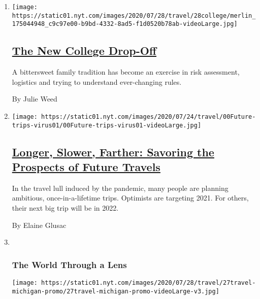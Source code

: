 \begin{enumerate}
\def\labelenumi{\arabic{enumi}.}
\item
  \texttt{[image: https://static01.nyt.com/images/2020/07/28/travel/28college/merlin\_175044948\_c9c97e00-b9bd-4332-8ad5-f1d0520b78ab-videoLarge.jpg]}

  \hypertarget{the-new-college-drop-off}{%
  \subsection{\texorpdfstring{\href{/2020/07/29/travel/virus-college-travel-restrictions.html}{The
  New College
  Drop-Off}}{The New College Drop-Off}}\label{the-new-college-drop-off}}

  A bittersweet family tradition has become an exercise in risk
  assessment, logistics and trying to understand ever-changing rules.

  By Julie Weed
\item
  \texttt{[image: https://static01.nyt.com/images/2020/07/24/travel/00Future-trips-virus01/00Future-trips-virus01-videoLarge.jpg]}

  \hypertarget{longer-slower-farther-savoring-the-prospects-of-future-travels}{%
  \subsection{\texorpdfstring{\href{/2020/07/28/travel/future-travel-bucket-list-coronavirus.html}{Longer,
  Slower, Farther: Savoring the Prospects of Future
  Travels}}{Longer, Slower, Farther: Savoring the Prospects of Future Travels}}\label{longer-slower-farther-savoring-the-prospects-of-future-travels}}

  In the travel lull induced by the pandemic, many people are planning
  ambitious, once-in-a-lifetime trips. Optimists are targeting 2021. For
  others, their next big trip will be in 2022.

  By Elaine Glusac
\item ~
  \hypertarget{the-world-through-a-lens-1}{%
  \subsubsection{The World Through a
  Lens}\label{the-world-through-a-lens-1}}

  \texttt{[image: https://static01.nyt.com/images/2020/07/28/travel/27travel-michigan-promo/27travel-michigan-promo-videoLarge-v3.jpg]}

  \hypertarget{on-the-lookout-for-moose-on-michigans-isle-royale}{%
}
\end{enumerate}
